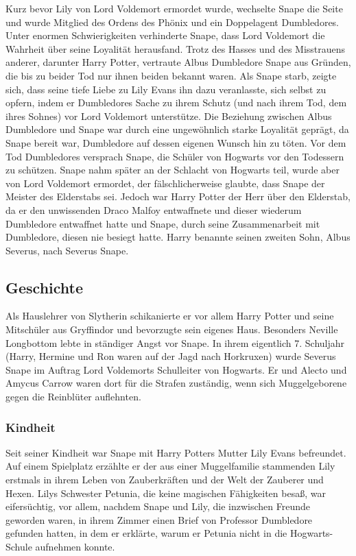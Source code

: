 \documentclass[a4paper, 10pt]{article}
\begin{document}
Kurz bevor Lily von Lord Voldemort ermordet wurde, wechselte Snape die Seite und wurde Mitglied des Ordens des Phönix und ein Doppelagent Dumbledores. Unter enormen Schwierigkeiten verhinderte Snape, dass Lord Voldemort die Wahrheit über seine Loyalität herausfand. Trotz des Hasses und des Misstrauens anderer, darunter Harry Potter, vertraute Albus Dumbledore Snape aus Gründen, die bis zu beider Tod nur ihnen beiden bekannt waren. Als Snape starb, zeigte sich, dass seine tiefe Liebe zu Lily Evans ihn dazu veranlasste, sich selbst zu opfern, indem er Dumbledores Sache zu ihrem Schutz (und nach ihrem Tod, dem ihres Sohnes) vor Lord Voldemort unterstütze.
\vspace{10pt}
\newline
Die Beziehung zwischen Albus Dumbledore und Snape war durch eine ungewöhnlich starke Loyalität geprägt, da Snape bereit war, Dumbledore auf dessen eigenen Wunsch hin zu töten. Vor dem Tod Dumbledores versprach Snape, die Schüler von Hogwarts vor den Todessern zu schützen. Snape nahm später an der Schlacht von Hogwarts teil, wurde aber von Lord Voldemort ermordet, der fälschlicherweise glaubte, dass Snape der Meister des Elderstabs sei. Jedoch war Harry Potter der Herr über den Elderstab, da er den unwissenden Draco Malfoy entwaffnete und dieser wiederum Dumbledore entwaffnet hatte und Snape, durch seine Zusammenarbeit mit Dumbledore, diesen nie besiegt hatte.
\vspace{10pt}
\newline
Harry benannte seinen zweiten Sohn, Albus Severus, nach Severus Snape.

\subsection*{\Large Geschichte}
Als Hauslehrer von Slytherin schikanierte er vor allem Harry Potter und seine Mitschüler aus Gryffindor und bevorzugte sein eigenes Haus. Besonders Neville Longbottom lebte in ständiger Angst vor Snape. In ihrem eigentlich 7. Schuljahr (Harry, Hermine und Ron waren auf der Jagd nach Horkruxen) wurde Severus Snape im Auftrag Lord Voldemorts Schulleiter von Hogwarts. Er und Alecto und Amycus Carrow waren dort für die Strafen zuständig, wenn sich Muggelgeborene gegen die Reinblüter auflehnten.

\subsubsection*{\large Kindheit}
Seit seiner Kindheit war Snape mit Harry Potters Mutter Lily Evans befreundet. Auf einem Spielplatz erzählte er der aus einer Muggelfamilie stammenden Lily erstmals in ihrem Leben von Zauberkräften und der Welt der Zauberer und Hexen. Lilys Schwester Petunia, die keine magischen Fähigkeiten besaß, war eifersüchtig, vor allem, nachdem Snape und Lily, die inzwischen Freunde geworden waren, in ihrem Zimmer einen Brief von Professor Dumbledore gefunden hatten, in dem er erklärte, warum er Petunia nicht in die Hogwarts-Schule aufnehmen konnte.
\end{document}
